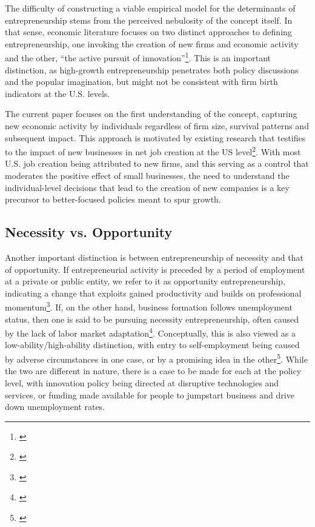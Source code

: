 The difficulty of constructing a viable empirical model for the determinants of entrepreneurship stems from the perceived nebulosity of the concept itself. In that sense, economic literature focuses on two distinct approaches to defining entrepreneurship, one invoking the creation of new firms and economic activity and the other, ``the active pursuit of innovation''\footnote{\cite[Page~367]{rocha2004entrepreneurship}}. This is an important distinction, as high-growth entrepreneurship penetrates both policy discussions and the popular imagination, but might not be consistent with firm birth indicators at the U.S. levels. 

The current paper focuses on the first understanding of the concept, capturing new economic activity by individuals regardless of firm size, survival patterns and subsequent impact. This approach is motivated by existing research that testifies to the impact of new businesses in net job creation at the US level\footnote{\cite{HaltiwangerJarminMiranda2013}}. With most U.S. job creation being attributed to new firms, and this serving as a control that moderates the positive effect of small businesses, the need to understand the individual-level decisions that lead to the creation of new companies is a key precursor to better-focused policies meant to spur growth.

\subsection{Necessity vs. Opportunity}

Another important distinction is between entrepreneurship of necessity and that of opportunity. If entrepreneurial activity is preceded by a period of employment at a private or public entity, we refer to it as opportunity entrepreneurship, indicating a change that exploits gained productivity and builds on professional momentum\footnote{\cite{Deli2011}}. If, on the other hand, business formation follows unemployment status, then one is said to be pursuing necessity entrepreneurship, often caused by the lack of labor market adaptation\footnote{\cite{Deli2011}}. Conceptually, this is also viewed as a low-ability/high-ability distinction, with entry to self-employment being caused by adverse circumstances in one case, or by a promising idea in the other\footnote{\cite{Deli2011}}. While the two are different in nature, there is a case to be made for each at the policy level, with innovation policy being directed at disruptive technologies and services, or funding made available for people to jumpstart business and drive down unemployment rates. 

